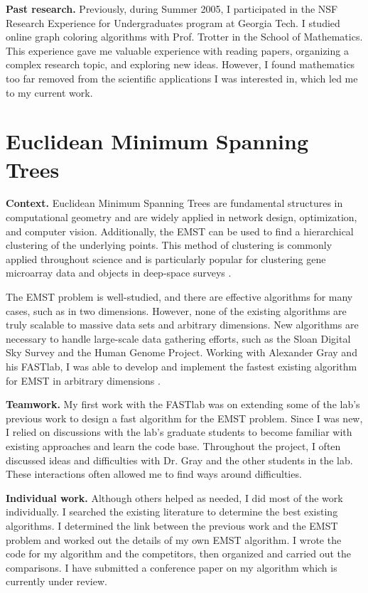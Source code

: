 \documentclass[twoside,leqno, 12pt]{article}
\begin{document}
\textbf{Past research.}  Previously, during Summer 2005, I participated in the NSF Research Experience for Undergraduates program at Georgia Tech.  I studied online graph coloring algorithms with Prof. Trotter in the School of Mathematics.  This experience gave me valuable experience with reading papers, organizing a complex research topic, and exploring new ideas.  However, I found mathematics too far removed from the scientific applications I was interested in, which led me to my current work.


\section{Euclidean Minimum Spanning Trees}

\textbf{Context.}  Euclidean Minimum Spanning Trees are fundamental structures in computational geometry and are widely applied in network design, optimization, and computer vision.  Additionally, the EMST can be used to find a hierarchical clustering of the underlying points.  This method of clustering is commonly applied throughout science and is particularly popular for clustering gene microarray data \cite{eisen_cluster} and objects in deep-space surveys \cite{barrow}.  

The EMST problem is well-studied, and there are effective algorithms for many cases, such as in two dimensions.  However, none of the existing algorithms are truly scalable to massive data sets and arbitrary dimensions.  New algorithms are necessary to handle large-scale data gathering efforts, such as the Sloan Digital Sky Survey and the Human Genome Project.  Working with Alexander Gray and his FASTlab, I was able to develop and implement the fastest existing algorithm for EMST in arbitrary dimensions \cite{my_emst}.

\textbf{Teamwork.}  My first work with the FASTlab was on extending some of the lab's previous work to design a fast algorithm for the EMST problem.  Since I was new, I relied on discussions with the lab's graduate students to become familiar with existing approaches and learn the code base.  Throughout the project, I often discussed ideas and difficulties with Dr. Gray and the other students in the lab.  These interactions often allowed me to find ways around difficulties.

\textbf{Individual work.}  Although others helped as needed, I did most of the work individually.  I searched the existing literature to determine the best existing algorithms.  I determined the link between the previous work and the EMST problem and worked out the details of my own EMST algorithm.  I wrote the code for my algorithm and the competitors, then organized and carried out the comparisons.  I have submitted a conference paper on my algorithm which is currently under review.  
\end{document}
